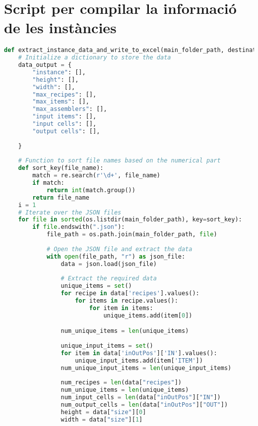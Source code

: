 

\chapter{Script per compilar la informació de les instàncies} %
\label{AppendixB}
\begin{lstlisting}[language=Python]
    def extract_instance_data_and_write_to_excel(main_folder_path, destination_folder):
    # Initialize a dictionary to store the data
    data_output = {
        "instance": [],
        "height": [],
        "width": [],
        "max_recipes": [],
        "max_items": [],
        "max_assemblers": [],
        "input items": [],
        "input cells": [],
        "output cells": [],
        
    }
    
    # Function to sort file names based on the numerical part
    def sort_key(file_name):
        match = re.search(r'\d+', file_name)
        if match:
            return int(match.group())
        return file_name
    i = 1
    # Iterate over the JSON files
    for file in sorted(os.listdir(main_folder_path), key=sort_key):
        if file.endswith(".json"):
            file_path = os.path.join(main_folder_path, file)
            
            # Open the JSON file and extract the data
            with open(file_path, "r") as json_file:
                data = json.load(json_file)
                
                # Extract the required data
                unique_items = set()
                for recipe in data['recipes'].values():
                    for items in recipe.values():
                        for item in items:
                            unique_items.add(item[0])

                num_unique_items = len(unique_items)
                
                unique_input_items = set()
                for item in data['inOutPos']['IN'].values():
                    unique_input_items.add(item['ITEM'])
                num_unique_input_items = len(unique_input_items)
                
                num_recipes = len(data["recipes"])
                num_unique_items = len(unique_items)
                num_input_cells = len(data["inOutPos"]["IN"])
                num_output_cells = len(data["inOutPos"]["OUT"])
                height = data["size"][0]
                width = data["size"][1]
                

\end{lstlisting}
